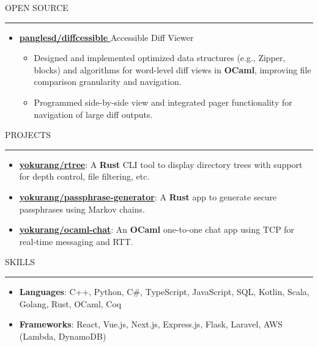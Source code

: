 \documentclass[letterpaper, 11pt]{article}
\def\sectionlineskip{\medskip}
\def\sectionskip{\medskip}
\def \entryspacing {-0pt}
\newcommand{\SectionHeading}[1]{
  \sectionskip
  \raggedright\raggedbottom\MakeUppercase{\large{#1}}
  \sectionlineskip
  \hrule
  \color{black}
}
\newcommand{\ResumeItem}[2]{
  \item{
    \textbf{#1}{: #2 \vspace{-2.835pt}}
  }
}
\newcommand{\ResumeItemDefault}[1]{
  \item{
    #1 \vspace{-2.835pt}
  }
}
\newcommand{\ResumeProjectItem}[3]{
  \item{
    \href{#2}{\textbf{#1}}{: #3 \vspace{-2.835pt}}
  }
}
\newcommand{\ResumeEntryStart}{\begin{itemize}[leftmargin=0mm, label={}]}
\newcommand{\ResumeEntryEnd}{\end{itemize}\vspace{-2.835pt}} %
\newcommand{\ResumeItemListStart}{\begin{itemize}[leftmargin=5mm, label=$\bullet$, itemsep=1mm, parsep=1mm]} %
\newcommand{\ResumeItemListEnd}{\end{itemize}}
\newcommand{\ProjectItemListStart}{\begin{itemize}[leftmargin=*, label=$\bullet$]}
\newcommand{\ProjectItemListEnd}{\end{itemize}\vspace{\entryspacing}}
\newcommand{\OpenSourceProjectItem}[3]{
  \item{
    \href{#1}{\textbf{#2} }\hfill{#3}\vspace{-2.835pt}
  }
}
\begin{document}
  \SectionHeading{Open Source}
  \ResumeEntryStart
  \OpenSourceProjectItem{https://github.com/panglesd/diffcessible}{panglesd/diffcessible}{Accessible Diff Viewer}
  \ResumeItemListStart
  \ResumeItemDefault{Designed and implemented optimized data structures (e.g., Zipper, blocks) and algorithms for word-level diff views in \textbf{OCaml}, improving file comparison granularity and navigation.}
  \ResumeItemDefault{Programmed side-by-side view and integrated pager functionality for navigation of large diff outputs.}
  \ResumeItemListEnd
  \ResumeEntryEnd

  \SectionHeading{Projects}
  \ProjectItemListStart
    \ResumeProjectItem{yokurang/rtree}
    {https://github.com/yokurang/rtree}
    {A \textbf{Rust} CLI tool to display directory trees with support for depth control, file filtering, etc.}
    \ResumeProjectItem{yokurang/passphrase-generator}
    {https://github.com/yokurang/passphrase-generator}
    {A \textbf{Rust} app to generate secure passphrases using Markov chains.}
    \ResumeProjectItem{yokurang/ocaml-chat}
    {https://github.com/yokurang/ocaml-chat}
    {An \textbf{OCaml} one-to-one chat app using TCP for real-time messaging and RTT.}
  \ProjectItemListEnd

  \SectionHeading{Skills}
  \ResumeEntryStart
    \ResumeItem{Languages}{ C++, Python, C\#, TypeScript, JavaScript, SQL, Kotlin, Scala, Golang, Rust, OCaml, Coq }
    \ResumeItem{Frameworks}{ React, Vue.js, Next.js, Express.js, Flask, Laravel, AWS (Lambda, DynamoDB) }
  \ResumeEntryEnd
\end{document}

